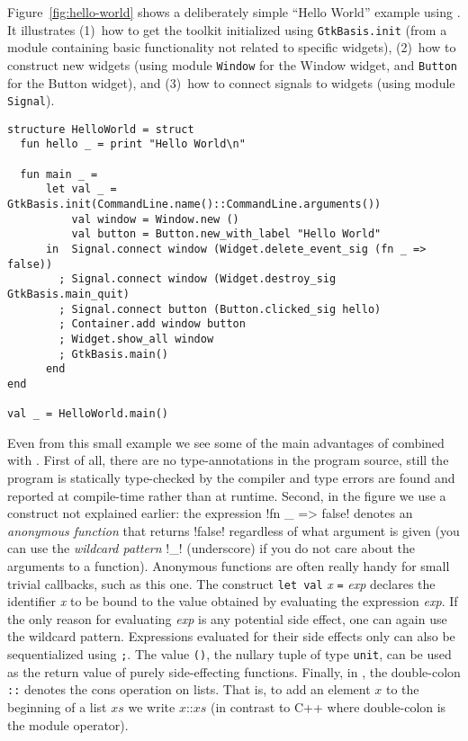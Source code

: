 \documentclass[workingdraft]{usetex-v1}
\begin{document}
Figure~\ref{fig:hello-world} shows a deliberately simple ``Hello World''
example using \mgtk. It illustrates (1)~how to get the toolkit
initialized using \texttt{GtkBasis.init} (from a module containing
basic \gtk functionality not related to specific widgets), (2)~how to
construct new widgets (using module \texttt{Window} for the Window
widget, and \texttt{Button} for the Button widget), and (3)~how to
connect signals to widgets (using module \texttt{Signal}).

\begin{figure*}[htp]
\begin{centering}
\begin{verbatim}
structure HelloWorld = struct
  fun hello _ = print "Hello World\n"

  fun main _ =
      let val _ = GtkBasis.init(CommandLine.name()::CommandLine.arguments())
          val window = Window.new ()
          val button = Button.new_with_label "Hello World"
      in  Signal.connect window (Widget.delete_event_sig (fn _ => false))
        ; Signal.connect window (Widget.destroy_sig GtkBasis.main_quit)
        ; Signal.connect button (Button.clicked_sig hello)
        ; Container.add window button
        ; Widget.show_all window
        ; GtkBasis.main() 
      end
end

val _ = HelloWorld.main()
\end{verbatim}
\caption{Hello World in \mgtk.\label{fig:hello-world}}
\end{centering}
\end{figure*}

Even from this small example we see some of the main advantages of
\sml combined with \gtk.  First of all, there are no type-annotations
in the program source, still the program is statically type-checked by
the compiler and type errors are found and reported at compile-time
rather than at runtime.  Second, in the figure we use a \sml construct
not explained earlier: the expression !fn _ => false!  denotes an
\emph{anonymous function} that returns !false! regardless of what
argument is given (you can use the \emph{wildcard pattern} !_!
(underscore) if you do not care about the arguments to a function).
Anonymous functions are often really handy for small trivial
callbacks, such as this one.  The construct \texttt{let}~\texttt{val}
\textit{x} \texttt{=} \textit{exp} declares the identifier \textit{x}
to be bound to the value obtained by evaluating the expression
\textit{exp}.  If the only reason for evaluating \textit{exp} is any
potential side effect, one can again use the wildcard pattern.
Expressions evaluated for their side effects only can also be
sequentialized using \texttt{;}.  The value \texttt{()}, the nullary
tuple of type \texttt{unit}, can be used as the return value of purely
side-effecting functions.  Finally, in \sml, the double-colon \texttt{::}
denotes the cons operation on lists.  That is, to add an element $x$
to the beginning of a list $\mathit{xs}$ we write $x \texttt{::}
\mathit{xs}$ (in contrast to C++ where double-colon is the module operator).
\end{document}
